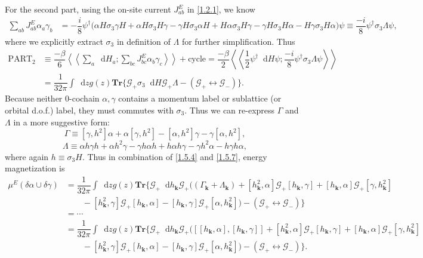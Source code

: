 \documentclass[10pt,nofootinbib]{revtex4}
\newcommand*\dd{\mathop{}\!\mathrm{d}}
\begin{document}
		\indent For the second part, using the on-site current $J^E_{ab}$ in \eqref{1.2.1}, we know
		\begin{align}\label{1.5.6}
			\sum_{ab}J^E_{ab}\alpha_a\gamma_b&=-\dfrac{i}{8}\psi^\dagger\bigg(\alpha H \sigma_3 \gamma H+\alpha H\sigma_3H\gamma-\gamma H\sigma_3\alpha H+H\alpha\sigma_3 H\gamma-\gamma H\sigma_3 H\alpha-H\gamma\sigma_3 H\alpha\bigg)\psi\equiv\dfrac{-i}{8}\psi^\dagger\sigma_3\Lambda\psi,
		\end{align}
		where we explicitly extract $\sigma_3$ in definition of $\Lambda$ for further simplification. 
		Thus
		\begin{align}\label{1.5.7}
			\text{PART}_2&\equiv\dfrac{-\beta}{6}\left\langle\left\langle\sum_a\dd H_a;\sum_{bc}J_{bc}^E \alpha_b\gamma_c\right\rangle\right\rangle+\text{cycle}=\dfrac{-\beta}{2}\left\langle\left\langle\dfrac{1}{2}\psi^\dagger\dd H\psi;\dfrac{-i}{8}\psi^\dagger\sigma_3\Lambda\psi\right\rangle\right\rangle\nonumber\\
			&=\dfrac{1}{32\pi}\int\dd zg(z)\mathbf{Tr}\bigg\{\mathcal{G}_+\sigma_3\dd H\mathcal{G}_+\Lambda-(\mathcal{G}_+\leftrightarrow\mathcal{G}_-)\bigg\}.
		\end{align}
		Because neither $0$-cochain $\alpha,\gamma$ contains a momentum label or sublattice (or orbital d.o.f.) label, they must commutes with $\sigma_3$. Thus we can re-express $\Gamma$ and $\Lambda$ in a more suggestive form:
		\begin{equation}\label{1.5.8}
			\Gamma\equiv[\gamma,h^2]\alpha+\alpha[\gamma,h^2]-[\alpha,h^2]\gamma- \gamma[\alpha,h^2],
		\end{equation}
		\begin{equation}\label{1.5.9}
			\Lambda\equiv \alpha h \gamma h+\alpha h^2 \gamma- \gamma h \alpha h+h \alpha h\gamma- \gamma h^2 \alpha-h\gamma h\alpha,
		\end{equation}
		where again $h\equiv\sigma_3 H$. Thus in combination of \eqref{1.5.4} and \eqref{1.5.7}, energy magnetization is
		\begin{align}\label{1.5.10}
			\mu^E(\delta\alpha\cup\delta\gamma)&=\dfrac{1}{32\pi}\int\dd z g(z)\mathbf{Tr}\bigg\{\mathcal{G}_+\dd h_{\bm{k}}\mathcal{G}_+\bigg((\Gamma_{\bm{k}}+\Lambda_{\bm{k}})+[h_{\bm{k}}^2,\alpha]\mathcal{G}_+[h_{\bm{k}},\gamma]+[h_{\bm{k}},\alpha]\mathcal{G}_+[\gamma,h_{\bm{k}}^2]\nonumber\\
			&\qquad-[h_{\bm{k}}^2,\gamma]\mathcal{G}_+[h_{\bm{k}},\alpha]-[h_{\bm{k}},\gamma]\mathcal{G}_+[\alpha,h_{\bm{k}}^2]\bigg)-(\mathcal{G}_+\leftrightarrow\mathcal{G}_-)\bigg\}\nonumber\\
			&=\cdots\nonumber\\
			&=\dfrac{1}{32\pi}\int\dd z g(z)\mathbf{Tr}\bigg\{\mathcal{G}_+\dd h_{\bm{k}}\mathcal{G}_+\bigg([[h_{\bm{k}},\alpha],[h_{\bm{k}},\gamma]]+[h_{\bm{k}}^2,\alpha]\mathcal{G}_+[h_{\bm{k}},\gamma]+[h_{\bm{k}},\alpha]\mathcal{G}_+[\gamma,h_{\bm{k}}^2]\nonumber\\
			&\qquad-[h_{\bm{k}}^2,\gamma]\mathcal{G}_+[h_{\bm{k}},\alpha]-[h_{\bm{k}},\gamma]\mathcal{G}_+[\alpha,h_{\bm{k}}^2]\bigg)-(\mathcal{G}_+\leftrightarrow\mathcal{G}_-)\bigg\}.
		\end{align}
\end{document}

